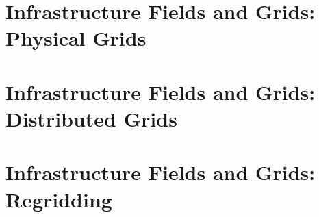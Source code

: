 \documentclass[english]{article}
\newcommand{\shortname}{GR}
\begin{document}
\part{Infrastructure Fields and Grids: Physical Grids}
\label{part:Infrastructure_Fields_and_Grids:_Physical_Grids}

\setcounter{section}{0}
\renewcommand{\thesection}{\shortname\arabic{section}}
\renewcommand{\thesubsection}{\shortname\arabic{section}.\arabic{subsection}}
\renewcommand{\thesubsubsection}{\shortname\arabic{section}.\arabic{subsection}.\arabic{subsubsection}}



\newpage
\begin{htmlonly}
\end{htmlonly}
\part{Infrastructure Fields and Grids: Distributed Grids}
\label{part:Infrastructure_Fields_and_Grids:_Distributed_Grids}

\setcounter{section}{0}
\renewcommand{\thesection}{\shortname\arabic{section}}
\renewcommand{\thesubsection}{\shortname\arabic{section}.\arabic{subsection}}
\renewcommand{\thesubsubsection}{\shortname\arabic{section}.\arabic{subsection}.\arabic{subsubsection}}



\newpage
\begin{htmlonly}
\end{htmlonly}
\part{Infrastructure Fields and Grids: Regridding}
\label{part:Infrastructure_Fields_and_Grids:_Regridding}

\setcounter{section}{0}
\renewcommand{\thesection}{\shortname\arabic{section}}
\renewcommand{\thesubsection}{\shortname\arabic{section}.\arabic{subsection}}
\renewcommand{\thesubsubsection}{\shortname\arabic{section}.\arabic{subsection}.\arabic{subsubsection}}


\newpage
\begin{htmlonly}
\end{htmlonly}
\end{document}
